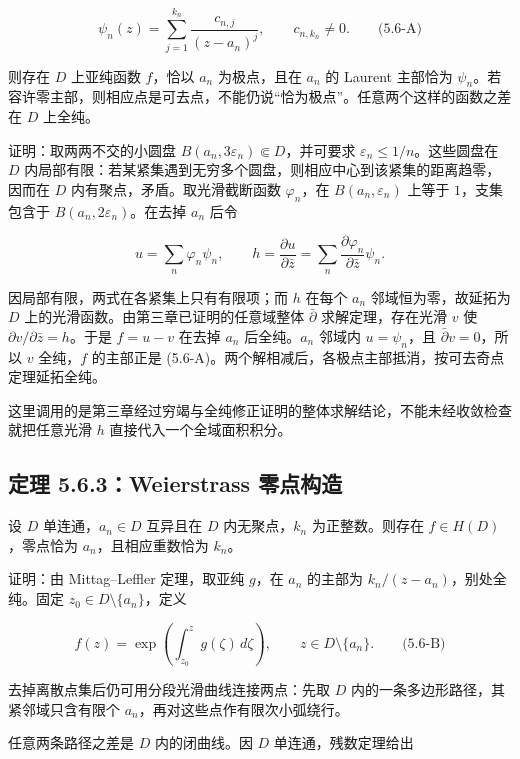 \documentclass[11pt,a4paper]{article}
\begin{document}
\[
\psi_n(z)=\sum_{j=1}^{k_n}\frac{c_{n,j}}{(z-a_n)^j},\qquad c_{n,k_n}\ne0.
\qquad\text{(5.6-A)}
\]

则存在 \(D\) 上亚纯函数 \(f\)，恰以 \(a_n\) 为极点，且在 \(a_n\) 的
Laurent 主部恰为
\(\psi_n\)。若容许零主部，则相应点是可去点，不能仍说``恰为极点''。任意两个这样的函数之差在
\(D\) 上全纯。

证明：取两两不交的小圆盘 \(B(a_n,3\varepsilon_n)\Subset D\)，并可要求
\(\varepsilon_n\le1/n\)。这些圆盘在 \(D\)
内局部有限：若某紧集遇到无穷多个圆盘，则相应中心到该紧集的距离趋零，因而在
\(D\) 内有聚点，矛盾。取光滑截断函数 \(\varphi_n\)，在
\(B(a_n,\varepsilon_n)\) 上等于 \(1\)，支集包含于
\(B(a_n,2\varepsilon_n)\)。在去掉 \(a_n\) 后令

\[
u=\sum_n\varphi_n\psi_n,\qquad
h=\frac{\partial u}{\partial\bar z}
=\sum_n\frac{\partial\varphi_n}{\partial\bar z}\psi_n.
\]

因局部有限，两式在各紧集上只有有限项；而 \(h\) 在每个 \(a_n\)
邻域恒为零，故延拓为 \(D\) 上的光滑函数。由第三章已证明的任意域整体
\(\bar\partial\) 求解定理，存在光滑 \(v\) 使
\(\partial v/\partial\bar z=h\)。于是 \(f=u-v\) 在去掉 \(a_n\)
后全纯。\(a_n\) 邻域内 \(u=\psi_n\)，且 \(\bar\partial v=0\)，所以 \(v\)
全纯，\(f\) 的主部正是
(5.6-A)。两个解相减后，各极点主部抵消，按可去奇点定理延拓全纯。

这里调用的是第三章经过穷竭与全纯修正证明的整体求解结论，不能未经收敛检查就把任意光滑
\(h\) 直接代入一个全域面积积分。

\subsection{定理 5.6.3：Weierstrass 零点构造}\label{ch05-s6-heading-3}

设 \(D\) 单连通，\(a_n\in D\) 互异且在 \(D\) 内无聚点，\(k_n\)
为正整数。则存在 \(f\in H(D)\)，零点恰为 \(a_n\)，且相应重数恰为
\(k_n\)。

证明：由 Mittag--Leffler 定理，取亚纯 \(g\)，在 \(a_n\) 的主部为
\(k_n/(z-a_n)\)，别处全纯。固定 \(z_0\in D\setminus\{a_n\}\)，定义

\[
f(z)=\exp\left(\int_{z_0}^z g(\zeta)\,d\zeta\right),
\qquad z\in D\setminus\{a_n\}.
\qquad\text{(5.6-B)}
\]

去掉离散点集后仍可用分段光滑曲线连接两点：先取 \(D\)
内的一条多边形路径，其紧邻域只含有限个
\(a_n\)，再对这些点作有限次小弧绕行。

任意两条路径之差是 \(D\) 内的闭曲线。因 \(D\) 单连通，残数定理给出
\end{document}
